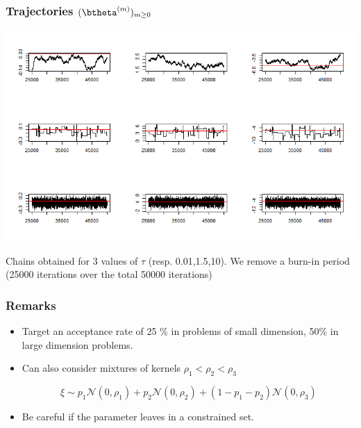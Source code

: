 \begin{frame}[fragile]\frametitle{Trajectories  $(\btheta^{(m)})_{m\geq 0}$}
\centering

\includegraphics[width=\linewidth]{figures/probit_mcmc.png} 


Chains obtained for  $3$ values of  $\tau$ (resp. 0.01,1.5,10). We remove a burn-in period (25000 iterations over the total 50000 iterations)
\end{frame}


\begin{frame}[fragile]\frametitle{Remarks}
 \begin{itemize}
  \item Target an acceptance rate of  25 \% in problems of small dimension, 50\% in large dimension problems. 
  \item Can also consider mixtures of kernels
$\rho_1 < \rho_2 < \rho_3$

$$\xi  \sim p_1 \mathcal{N}(0,\rho_1) + p_2 \mathcal{N}(0,\rho_2)+ (1-p_1-p_2) \mathcal{N}(0,\rho_3)$$
\item Be careful if the parameter leaves in a constrained set. 
\end{itemize}
\end{frame}


